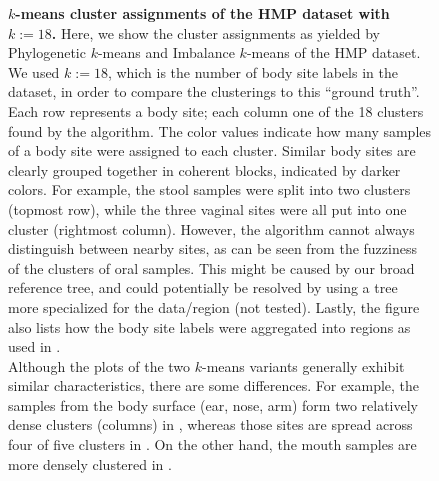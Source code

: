 \begin{figure}[hpbt]
    \centering
    \begin{subfigure}{0pt}
        \label{fig:hmp_kmeans_all_18:sub:em_unconstr}
    \end{subfigure}
    \begin{subfigure}{0pt}
        \label{fig:hmp_kmeans_all_18:sub:ei_unconstr}
    \end{subfigure}
    \caption[$k$-means cluster assignments of the \ac{HMP} dataset with $k:=18$]{
        \textbf{$k$-means cluster assignments of the \ac{HMP} dataset with $k:=18$.}
        Here, we show the cluster assignments as yielded by
        Phylogenetic $k$-means  and
        Imbalance $k$-means  of the \ac{HMP} dataset.
        We used $k:=18$, which is the number of body site labels in the dataset,
        in order to compare the clusterings to this ``ground truth''.
        Each row represents a body site; each column one of the 18 clusters found by the algorithm.
        The color values indicate how many samples of a body site were assigned to each cluster.
        Similar body sites are clearly grouped together in coherent blocks, indicated by darker colors.
        For example, the stool samples were split into two clusters (topmost row),
        while the three vaginal sites were all put into one cluster (rightmost column).
        However, the algorithm cannot always distinguish between nearby sites,
        as can be seen from the fuzziness of the clusters of oral samples.
        This might be caused by our broad reference tree,
        and could potentially be resolved by using a tree more specialized for the data/region (not tested).
        Lastly, the figure also lists how the body site labels were aggregated into regions
        as used in .
        \\
        Although the plots of the two $k$-means variants generally exhibit similar characteristics,
        there are some differences.
        For example, the samples from the body surface (ear, nose, arm)
        form two relatively dense clusters (columns) in ,
        whereas those sites are spread across four of five clusters in .
        On the other hand, the mouth samples are more densely clustered in .
    }
    \label{fig:hmp_kmeans_all_18}
\end{figure}

